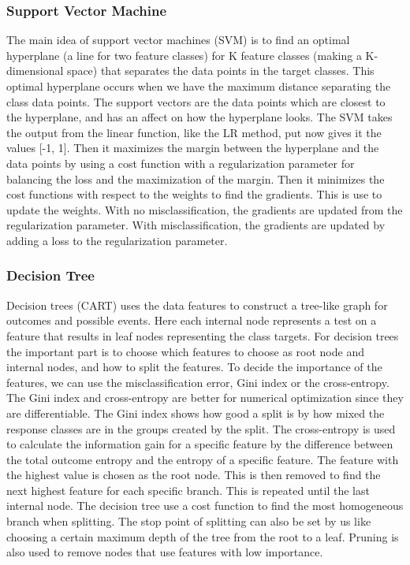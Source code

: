 \documentclass[12pt,a4paper,english]{article}
\begin{document}
\subsubsection{Support Vector Machine}
\label{subsubsect:SVM}
The main idea of support vector machines (SVM) is to find an optimal hyperplane (a line for two feature classes) for K feature classes (making a K-dimensional space) that separates the data points in the target classes. This optimal hyperplane occurs when we have the maximum distance separating the class data points. The support vectors are the data points which are closest to the hyperplane, and has an affect on how the hyperplane looks. The SVM takes the output from the linear function, like the LR method, put now gives it the values [-1, 1]. Then it maximizes the margin between the hyperplane and the data points by using a cost function with a regularization parameter for balancing the loss and the maximization of the margin. Then it minimizes the cost functions with respect to the weights to find the gradients. This is use to update the weights. With no misclassification, the gradients are updated from the regularization parameter. With misclassification, the gradients are updated by adding a loss to the regularization parameter. \cite{SVM}

\subsubsection{Decision Tree}
\label{subsubsect:Tree}
Decision trees (CART) uses the data features to construct a tree-like graph for outcomes and possible events. Here each internal node represents a test on a feature that results in leaf nodes representing the class targets. For decision trees the important part is to choose which features to choose as root node and internal nodes, and how to split the features. To decide the importance of the features, we can use the misclassification error, Gini index or the cross-entropy. The Gini index and cross-entropy are better for numerical optimization since they are differentiable. The Gini index shows how good a split is by how mixed the response classes are in the groups created by the split. The cross-entropy is used to calculate the information gain for a specific feature by the difference between the total outcome entropy and the entropy of a specific feature. The feature with the highest value is chosen as the root node. This is then removed to find the next highest feature for each specific branch. This is repeated until the last internal node. The decision tree use a cost function to find the most homogeneous branch when splitting. The stop point of splitting can also be set by us like choosing a certain maximum depth of the tree from the root to a leaf. Pruning is also used to remove nodes that use features with low importance.
\end{document}
